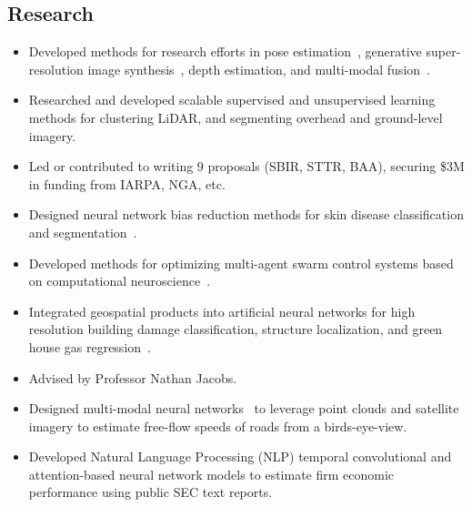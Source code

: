 \documentclass[11pt,a4paper,sans]{moderncv} %
\begin{document}
\subsection{Research}
{
\begin{itemize} 
	\item Developed methods for research efforts in pose estimation~\cite{ProbTraffic}, generative super-resolution image synthesis~\cite{Low2High}, depth estimation, and multi-modal fusion~\cite{greenwell2024watch, ProbTraffic}.
	\item Researched and developed scalable supervised and unsupervised learning methods for clustering LiDAR, and segmenting overhead and ground-level imagery.
	\item Led or contributed to writing 9 proposals (SBIR, STTR, BAA), securing \$3M in funding from IARPA, NGA, etc.
\end{itemize}
}
{
\begin{itemize} 
	\item Designed neural network bias reduction methods for skin disease classification and segmentation~\cite{yuan2023edgemixup, paul2022tara}.
	\item Developed methods for optimizing multi-agent swarm control systems based on computational neuroscience~\cite{hadzic2022100218, buckley2021interdisciplinary}.
	\item Integrated geospatial products into artificial neural networks for high resolution building damage classification, structure localization, and green house gas regression~\cite{mukherjee2021towards}.  
\end{itemize}
}
{
\begin{itemize} 
	\item Advised by Professor Nathan Jacobs.
	\item Designed multi-modal neural networks~\cite{RasterNetpaper, chen2021safety} to leverage point clouds and satellite imagery to estimate free-flow speeds of roads from a birds-eye-view.
	\item Developed Natural Language Processing (NLP) temporal convolutional and attention-based neural network models to estimate firm economic performance using public SEC text reports. 
\end{itemize}
}
\end{document}

